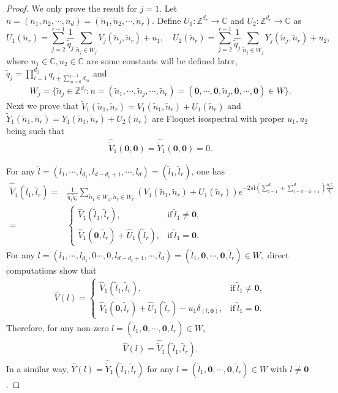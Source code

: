 \documentclass[10pt,a4paper]{amsart}
\def\C{{\mathbb C}}
\begin{document}
\begin{proof}We only prove the result for $j=1$. Let $n=(n_1,n_2,\cdots,n_d)=(\tilde{n}_1,\tilde{n}_2,\cdots,\tilde{n}_r)$.
Define $U_1:\mathbb{Z}^{d_r}\to\mathbb{C}$ and $U_2:\mathbb{Z}^{d_r}\to\mathbb{C}$ as
\[U_1(\tilde{n}_r)=\sum_{j=2}^{r-1}\frac{1}{\tilde{q}_j}\sum_{\tilde{n}_j\in W_j}V_j(\tilde{n}_j,\tilde{n}_r)+u_1,\quad
U_2(\tilde{n}_r)=\sum_{j=2}^{r-1}\frac{1}{\tilde{q}_j}\sum_{\tilde{n}_j\in W_j}Y_j(\tilde{n}_j,\tilde{n}_r)+u_2,\]
where $u_1\in\C,u_2\in\C$ are some constants will be defined later,
$\tilde{q}_j=\prod_{i=1}^{d_j}q_{i+\sum_{m=0}^{j-1}d_m}$ and
\begin{align}
W_j=\Big\{\tilde{n}_j\in \mathbb{Z}^{d_j}:n=(\tilde{n}_1,\cdots,\tilde{n}_j,\cdots,\tilde{n}_r)=(\mathbf{0},\cdots,\mathbf{0},\tilde{n}_j,\mathbf{0},\cdots,\mathbf{0})\in W\Big\}.\nonumber
\end{align}
Next we prove that $\tilde{V}_1(\tilde{n}_1,\tilde{n}_r)=V_1(\tilde{n}_1,\tilde{n}_r)+U_1(\tilde{n}_r)$ and $\tilde{Y}_1(\tilde{n}_1,\tilde{n}_r)=Y_1(\tilde{n}_1,\tilde{n}_r)+U_2(\tilde{n}_r)$ are Floquet isospectral with proper $u_1,u_2$ being such that
\begin{align}
\hat{\tilde{V}}_1(\mathbf{0},\mathbf{0})=\hat{\tilde{Y}}_1(\mathbf{0},\mathbf{0})=0.\label{mathbf00vy}
\end{align}

For any $\hat{l}=(l_1,\cdots,l_{d_1},l_{d-d_r+1},\cdots,l_d)=(\tilde{l}_1,\tilde{l}_r)$, one has
\begin{align}
\hat{\tilde{V}}_1(\tilde{l}_1,\tilde{l}_r)=&\frac{1}{\tilde{q}_1\tilde{q}_r}\sum_{\tilde{n}_1\in W_1,\tilde{n}_r\in W_r}\left(V_1(\tilde{n}_1,\tilde{n}_r)+U_1(\tilde{n}_r)\right)e^{-2\pi\mathbf{i}\left(\sum_{i=1}^{d_1}+\sum_{i=d-d_r+1}^d\right)\frac{n_il_i}{q_i}}\nonumber\\
=&\begin{cases}
\hat{V}_1(\tilde{l}_1,\tilde{l}_r),&\mathrm{if}\ \tilde{l}_1\neq\mathbf{0},\\
\hat{V}_1(\mathbf{0},\tilde{l}_r)+\hat{U}_1(\tilde{l}_r),&\mathrm{if}\ \tilde{l}_1=\mathbf{0}.
\end{cases}\nonumber
\end{align}
For any $l=(l_1,\cdots,l_{d_1},0\cdots,0,l_{d-d_r+1},\cdots,l_d)=(\tilde{l}_1,\mathbf{0},\cdots,\mathbf{0},\tilde{l}_r)\in W,$
direct computations show that
\begin{align}
\hat{V}(l)=\begin{cases}
\hat{V}_1(\tilde{l}_1,\tilde{l}_r),&\mathrm{if}\ \tilde{l}_1\neq\mathbf{0},\\
\hat{V}_1(\mathbf{0},\tilde{l}_r)+\hat{U}_1(\tilde{l}_r)-u_1\delta_{(l;\mathbf{0})},&\mathrm{if}\ \tilde{l}_1=\mathbf{0}.
\end{cases}\nonumber
\end{align}
{Therefore, for any non-zero $l=(\tilde{l}_1,\mathbf{0},\cdots,\mathbf{0},\tilde{l}_r)\in W$,
\begin{align}
\hat{V}(l)=\hat{\tilde{V}}_1(\tilde{l}_1,\tilde{l}_r).\label{vhatequalvtildehat}
\end{align}
In a similar way,
$\hat{Y}(l)=\hat{\tilde{Y}}_1(\tilde{l}_1,\tilde{l}_r)$ for any $l=(\tilde{l}_1,\mathbf{0},\cdots,\mathbf{0},\tilde{l}_r)\in W$ with $l\neq \mathbf{0}$.}


\end{proof}
\end{document}
